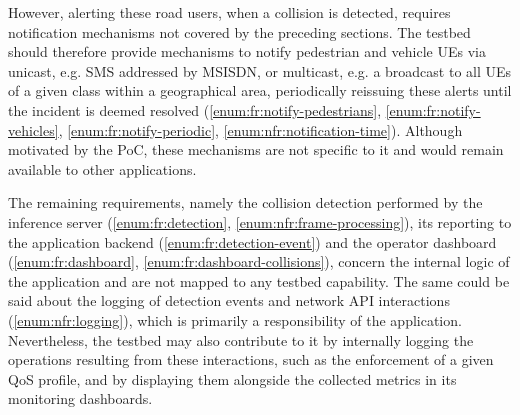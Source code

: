 However, alerting these road users, when a collision is detected, requires notification mechanisms not covered by the preceding sections. The testbed should therefore provide mechanisms to notify pedestrian and vehicle \acsp{UE} via unicast, e.g. \acs{SMS} addressed by \acs{MSISDN}, or multicast, e.g. a broadcast to all \acsp{UE} of a given class within a geographical area, periodically reissuing these alerts until the incident is deemed resolved (\ref{enum:fr:notify-pedestrians}, \ref{enum:fr:notify-vehicles}, \ref{enum:fr:notify-periodic}, \ref{enum:nfr:notification-time}). Although motivated by the \acs{PoC}, these mechanisms are not specific to it and would remain available to other applications.

The remaining requirements, namely the collision detection performed by the inference server (\ref{enum:fr:detection}, \ref{enum:nfr:frame-processing}), its reporting to the application backend (\ref{enum:fr:detection-event}) and the operator dashboard (\ref{enum:fr:dashboard}, \ref{enum:fr:dashboard-collisions}), concern the internal logic of the application and are not mapped to any testbed capability. The same could be said about the logging of detection events and network \acs{API} interactions (\ref{enum:nfr:logging}), which is primarily a responsibility of the application. Nevertheless, the testbed may also contribute to it by internally logging the operations resulting from these interactions, such as the enforcement of a given \acs{QoS} profile, and by displaying them alongside the collected metrics in its monitoring dashboards.
